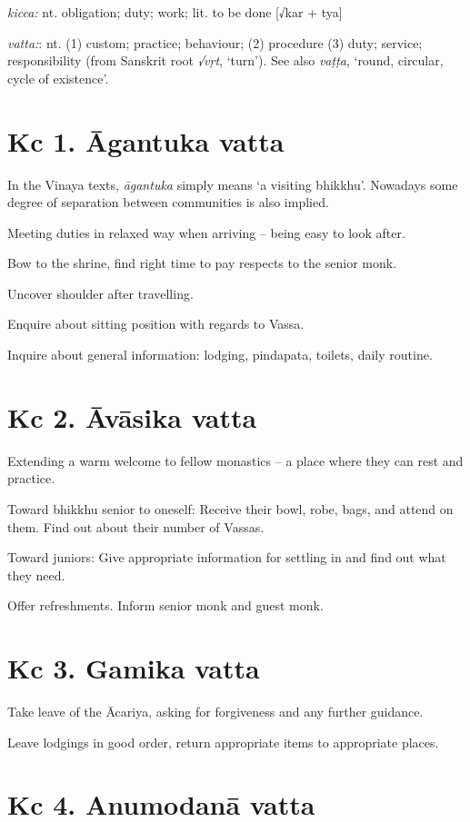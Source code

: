 \emph{kicca:} nt. obligation; duty; work; lit. to be done {[}√kar +
tya{]}

\emph{vatta:}: nt. (1) custom; practice; behaviour; (2) procedure (3)
duty; service; responsibility (from Sanskrit root \emph{√vṛt}, `turn').
See also \emph{vaṭṭa}, `round, circular, cycle of existence'.

\section{Kc 1. Āgantuka vatta}

In the Vinaya texts, \emph{āgantuka} simply means `a visiting bhikkhu'.
Nowadays some degree of separation between communities is also implied.

Meeting duties in relaxed way when arriving -- being easy to look after.

Bow to the shrine, find right time to pay respects to the senior monk.

Uncover shoulder after travelling.

Enquire about sitting position with regards to Vassa.

Inquire about general information: lodging, pindapata, toilets, daily
routine.

\clearpage

\section{Kc 2. Āvāsika vatta}

Extending a warm welcome to fellow monastics -- a place where they can
rest and practice.

Toward bhikkhu senior to oneself: Receive their bowl, robe, bags, and
attend on them. Find out about their number of Vassas.

Toward juniors: Give appropriate information for settling in and find
out what they need.

Offer refreshments. Inform senior monk and guest monk.

\section{Kc 3. Gamika vatta}

Take leave of the Ācariya, asking for forgiveness and any further
guidance.

Leave lodgings in good order, return appropriate items to appropriate
places.

\section{Kc 4. Anumodanā vatta}

